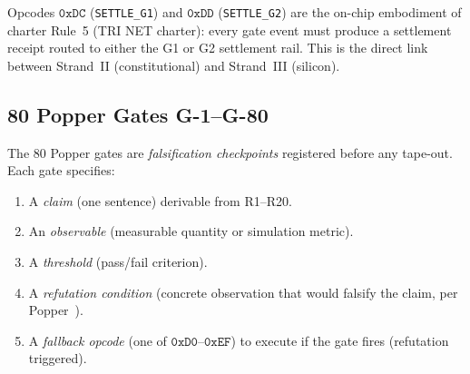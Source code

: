 \begin{remark}
Opcodes $\mathtt{0xDC}$ (\texttt{SETTLE\_G1}) and $\mathtt{0xDD}$
(\texttt{SETTLE\_G2}) are the on-chip embodiment of charter Rule~5
(TRI NET charter): every gate event must produce a settlement receipt
routed to either the G1 or G2 settlement rail.  This is the direct link
between Strand~II (constitutional) and Strand~III (silicon).
\end{remark}

\subsection{80 Popper Gates G-1--G-80}
\label{sec74:popper-gates}

The 80 Popper gates are \emph{falsification checkpoints} registered
before any tape-out.  Each gate specifies:
\begin{enumerate}
  \item A \emph{claim} (one sentence) derivable from R1--R20.
  \item An \emph{observable} (measurable quantity or simulation metric).
  \item A \emph{threshold} (pass/fail criterion).
  \item A \emph{refutation condition} (concrete observation that would
    falsify the claim, per Popper~\cite{popper1959}).
  \item A \emph{fallback opcode} (one of $\mathtt{0xD0}$--$\mathtt{0xEF}$)
    to execute if the gate fires (refutation triggered).
\end{enumerate}

